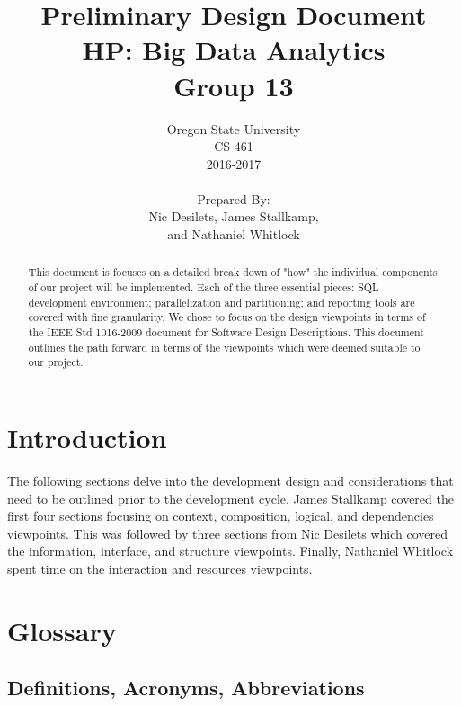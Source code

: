 \documentclass[draftclsnofoot, onecolumn, compsoc, 10pt]{IEEEtran}
\title{\Huge Preliminary Design Document\\\large HP: Big Data Analytics\\Group 13}
\author{Oregon State University\\CS 461\\2016-2017\\\\Prepared By:\\Nic Desilets, James Stallkamp,\\and Nathaniel Whitlock}
\begin{document}
\begin{titlingpage}
    \maketitle 
    
    \vspace{1in}
    \begin{abstract}
		\noindent This document is focuses on a detailed break down of "how" the individual components of our project will be implemented.
        Each of the three essential pieces: SQL development environment; parallelization and partitioning; and reporting tools are covered with fine granularity.
        We chose to focus on the design viewpoints in terms of the IEEE Std 1016-2009 document for Software Design Descriptions.
        This document outlines the path forward in terms of the viewpoints which were deemed suitable to our project.      
    \end{abstract}
\end{titlingpage}

{\small\tableofcontents} %
\pagebreak

\section{Introduction}
The following sections delve into the development design and considerations that need to be outlined prior to the development cycle.
James Stallkamp covered the first four sections focusing on context, composition, logical, and dependencies viewpoints.
This was followed by three sections from Nic Desilets which covered the information, interface, and structure viewpoints.
Finally, Nathaniel Whitlock spent time on the interaction and resources viewpoints.\

\section{Glossary}
\subsection{Definitions, Acronyms, Abbreviations}
\end{document}
